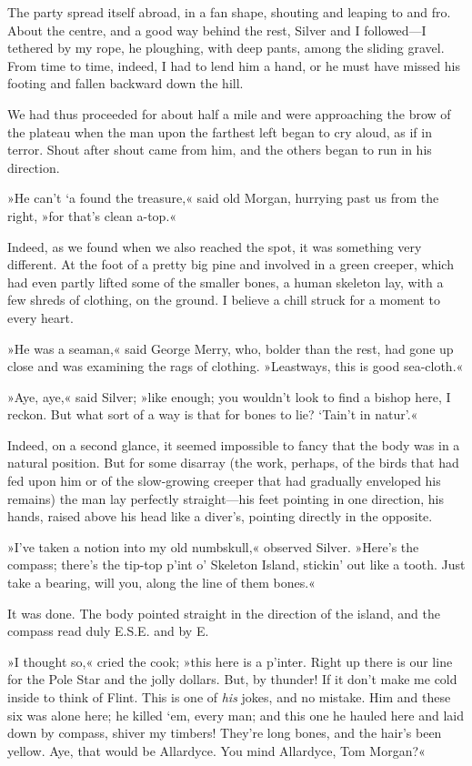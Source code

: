 The party spread itself abroad, in a fan shape, shouting and leaping to and fro. About the centre, and a good way behind the rest, Silver and I followed—I tethered by my rope, he ploughing, with deep pants, among the sliding gravel. From time to time, indeed, I had to lend him a hand, or he must have missed his footing and fallen backward down the hill.

We had thus proceeded for about half a mile and were approaching the brow of the plateau when the man upon the farthest left began to cry aloud, as if in terror. Shout after shout came from him, and the others began to run in his direction.

»He can't `a found the treasure,« said old Morgan, hurrying past us from the right, »for that's clean a-top.«

Indeed, as we found when we also reached the spot, it was something very different. At the foot of a pretty big pine and involved in a green creeper, which had even partly lifted some of the smaller bones, a human skeleton lay, with a few shreds of clothing, on the ground. I believe a chill struck for a moment to every heart.

»He was a seaman,« said George Merry, who, bolder than the rest, had gone up close and was examining the rags of clothing. »Leastways, this is good sea-cloth.«

»Aye, aye,« said Silver; »like enough; you wouldn't look to find a bishop here, I reckon. But what sort of a way is that for bones to lie? `Tain't in natur'.«

Indeed, on a second glance, it seemed impossible to fancy that the body was in a natural position. But for some disarray (the work, perhaps, of the birds that had fed upon him or of the slow-growing creeper that had gradually enveloped his remains) the man lay perfectly straight—his feet pointing in one direction, his hands, raised above his head like a diver's, pointing directly in the opposite.

»I've taken a notion into my old numbskull,« observed Silver. »Here's the compass; there's the tip-top p'int o' Skeleton Island, stickin' out like a tooth. Just take a bearing, will you, along the line of them bones.«

It was done. The body pointed straight in the direction of the island, and the compass read duly E.S.E. and by E.

»I thought so,« cried the cook; »this here is a p'inter. Right up there is our line for the Pole Star and the jolly dollars. But, by thunder! If it don't make me cold inside to think of Flint. This is one of \textit{his} jokes, and no mistake. Him and these six was alone here; he killed `em, every man; and this one he hauled here and laid down by compass, shiver my timbers! They're long bones, and the hair's been yellow. Aye, that would be Allardyce. You mind Allardyce, Tom Morgan?«


